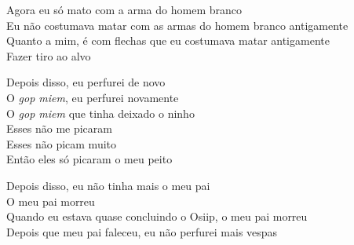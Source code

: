   \noindent Agora eu só mato com a arma do homem branco\\
  Eu não costumava matar com as armas do homem branco antigamente\\
  Quanto a mim, é com flechas que eu costumava matar antigamente\\
  Fazer tiro ao alvo
 
 \smallskip
 \begin{center}\end{center}
 \smallskip
 
\noindent   Depois disso, eu perfurei de novo\\
  O \textit{gop miem}, eu perfurei novamente\\
  O \textit{gop miem} que tinha deixado o ninho\\
  Esses não me picaram\\
  Esses não picam muito\\
  Então eles só picaram o meu peito
 
 \smallskip
 \begin{center}\end{center}
 \smallskip
 
\noindent   Depois disso, eu não tinha mais o meu pai\\
  O meu pai morreu\\
  Quando eu estava quase concluindo o Osiip, o meu pai morreu\\
  Depois que meu pai faleceu, eu não perfurei mais vespas
 
 \smallskip
 \begin{center}\end{center}
 \smallskip
 
